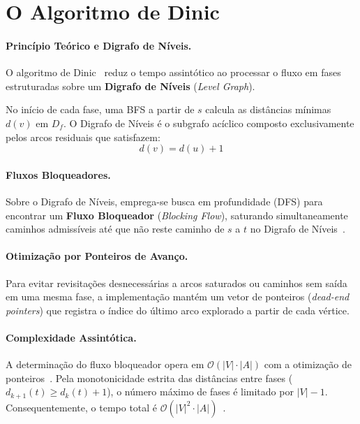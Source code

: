 \section{O Algoritmo de Dinic}\label{sec:dinic}

\paragraph{Princípio Teórico e Digrafo de Níveis.}
O algoritmo de Dinic~\cite{dinic1970algorithm} reduz o tempo assintótico ao processar o fluxo em fases estruturadas sobre um \textbf{Digrafo de Níveis} (\textit{Level Graph}).

No início de cada fase, uma BFS a partir de $s$ calcula as distâncias mínimas $d(v)$ em $D_f$. O Digrafo de Níveis é o subgrafo acíclico composto exclusivamente pelos arcos residuais que satisfazem:
\begin{equation}
    d(v) = d(u) + 1
\end{equation}

\paragraph{Fluxos Bloqueadores.}
Sobre o Digrafo de Níveis, emprega-se busca em profundidade (DFS) para encontrar um \textbf{Fluxo Bloqueador} (\textit{Blocking Flow}), saturando simultaneamente caminhos admissíveis até que não reste caminho de $s$ a $t$ no Digrafo de Níveis~\cite{cook1998combinatorial}.

\paragraph{Otimização por Ponteiros de Avanço.}
Para evitar revisitações desnecessárias a arcos saturados ou caminhos sem saída em uma mesma fase, a implementação mantém um vetor de ponteiros (\textit{dead-end pointers}) que registra o índice do último arco explorado a partir de cada vértice.

\paragraph{Complexidade Assintótica.}
A determinação do fluxo bloqueador opera em $\mathcal{O}(|V| \cdot |A|)$ com a otimização de ponteiros~\cite{korte2018combinatorial}. Pela monotonicidade estrita das distâncias entre fases ($d_{k+1}(t) \ge d_k(t) + 1$), o número máximo de fases é limitado por $|V| - 1$. Consequentemente, o tempo total é $\mathcal{O}(|V|^2 \cdot |A|)$~\cite{dinic1970algorithm}.

